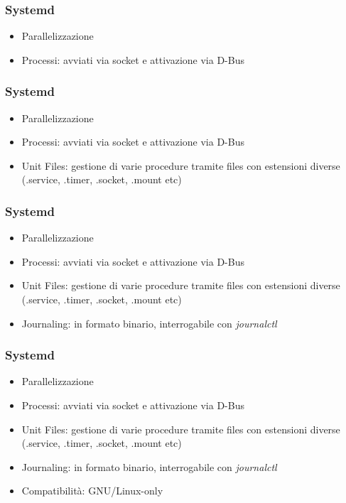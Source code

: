 \documentclass{beamer}
\begin{document}

\begin{frame}
	\frametitle{Systemd}
	\begin{itemize}
		\item Parallelizzazione
		\item Processi: avviati via socket e attivazione via D-Bus
	\end{itemize}
\end{frame}


\begin{frame}
	\frametitle{Systemd}
	\begin{itemize}
		\item Parallelizzazione
		\item Processi: avviati via socket e attivazione via D-Bus
		\item Unit Files: gestione di varie procedure tramite files con estensioni diverse (.service, .timer, .socket, .mount etc)
	\end{itemize}
\end{frame}


\begin{frame}
	\frametitle{Systemd}
	\begin{itemize}
		\item Parallelizzazione
		\item Processi: avviati via socket e attivazione via D-Bus
		\item Unit Files: gestione di varie procedure tramite files con estensioni diverse (.service, .timer, .socket, .mount etc)
		\item Journaling: in formato binario, interrogabile con \textit{journalctl}
	\end{itemize}
\end{frame}


\begin{frame}
	\frametitle{Systemd}
	\begin{itemize}
		\item Parallelizzazione
		\item Processi: avviati via socket e attivazione via D-Bus
		\item Unit Files: gestione di varie procedure tramite files con estensioni diverse (.service, .timer, .socket, .mount etc)
		\item Journaling: in formato binario, interrogabile con \textit{journalctl}
		\item Compatibilit\`a: GNU/Linux-only
	\end{itemize}
\end{frame}
\end{document}
